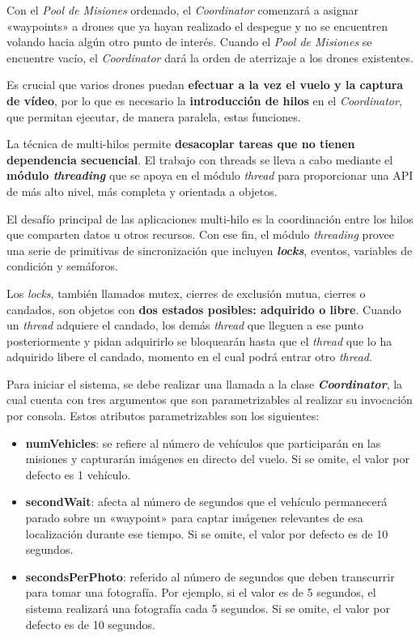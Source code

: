 Con el \textit{Pool de Misiones} ordenado, el \textit{Coordinator} comenzará a asignar «waypoints» a drones que ya hayan realizado el despegue y no se encuentren volando hacia algún otro punto de interés. Cuando el \textit{Pool de Misiones} se encuentre vacío, el \textit{Coordinator} dará la orden de aterrizaje a los drones existentes.

Es crucial que varios drones puedan \textbf{efectuar a la vez el vuelo y la captura de vídeo}, por lo que es necesario la \textbf{introducción de hilos} en el \textit{Coordinator}, que permitan ejecutar, de manera paralela, estas funciones. 

La técnica de multi-hilos permite \textbf{desacoplar tareas que no tienen dependencia secuencial}. El trabajo con threads se lleva a cabo mediante el \textbf{módulo \textit{threading}} que se apoya en el módulo \textit{thread} para proporcionar una \acs{API} de más alto nivel, más completa y orientada a objetos. 

El desafío principal de las aplicaciones multi-hilo es la coordinación entre los hilos que comparten datos u otros recursos. Con ese fin, el módulo \textit{threading} provee una serie de primitivas de sincronización que incluyen \textbf{\textit{locks}}, eventos, variables de condición y semáforos. 

Los \textit{locks}, también llamados mutex, cierres de exclusión mutua, cierres o candados, son objetos con \textbf{dos estados posibles: adquirido o libre}. Cuando un \textit{thread} adquiere el candado, los demás \textit{thread} que lleguen a ese punto posteriormente y pidan adquirirlo se bloquearán hasta que el \textit{thread} que lo ha adquirido libere el candado, momento en el cual podrá entrar otro \textit{thread}.

Para iniciar el sistema, se debe realizar una llamada a la clase \textbf{\textit{Coordinator}}, la cual cuenta con tres argumentos que son parametrizables al realizar su invocación por consola. Estos atributos parametrizables son los siguientes:
\begin{itemize}
\item \textbf{numVehicles}: se refiere al número de vehículos que participarán en las misiones y capturarán imágenes en directo del vuelo. Si se omite, el valor por defecto es 1 vehículo.
\item \textbf{secondWait}: afecta al número de segundos que el vehículo permanecerá parado sobre un «waypoint» para captar imágenes relevantes de esa localización durante ese tiempo. Si se omite, el valor por defecto es de 10 segundos.
\item \textbf{secondsPerPhoto}: referido al número de segundos que deben transcurrir para tomar una fotografía. Por ejemplo, si el valor es de 5 segundos, el sistema realizará una fotografía cada 5 segundos. Si se omite, el valor por defecto es de 10 segundos. \\
\end{itemize} 

